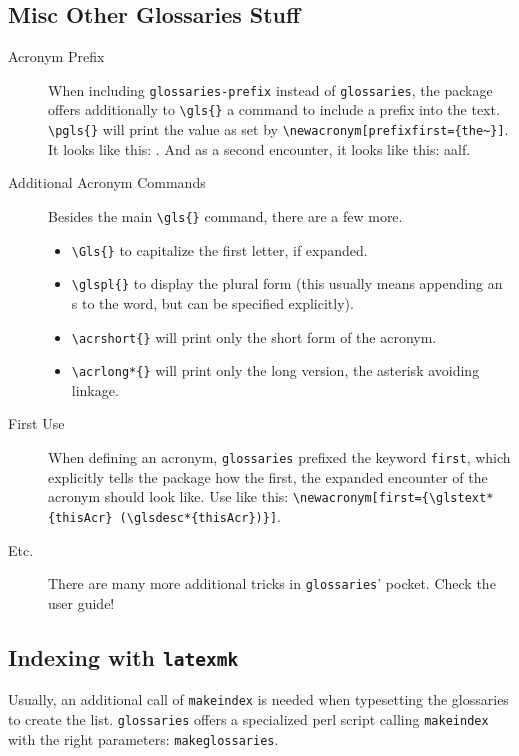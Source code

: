 \subsection{Misc Other Glossaries Stuff} %
\label{sub:misc_other_glossaries_stuff}
\begin{description}
	\item[Acronym Prefix] When including \texttt{glossaries-prefix} instead of \texttt{glossaries}, the package offers additionally to \verb|\gls{}| a command to include a prefix into the text. \verb|\pgls{}| will print the value as set by \verb|\newacronym[prefixfirst={the~}]|. It looks like this: . And as a second encounter, it looks like this: \gls{aalf}.
	\item[Additional Acronym Commands] Besides the main \verb|\gls{}| command, there are a few more. 
	\begin{itemize}
	 	\item \verb|\Gls{}| to capitalize the first letter, if expanded. 
	 	\item \verb|\glspl{}| to display the plural form (this usually means appending an s to the word, but can be specified explicitly).
	 	\item \verb|\acrshort{}| will print only the short form of the acronym.
	 	\item \verb|\acrlong*{}| will print only the long version, the asterisk avoiding linkage.
	 \end{itemize}
	 \item[First Use] When defining an acronym, \texttt{glossaries} prefixed the keyword \texttt{first}, which explicitly tells the package how the first, the expanded encounter of the acronym should look like. Use like this: \verb|\newacronym[first={\glstext*{thisAcr} (\glsdesc*{thisAcr})}]|.
	 \item[Etc.] There are many more additional tricks in \texttt{glossaries}' pocket. Check the user guide!
\end{description}
\subsection{Indexing with \texttt{latexmk}} %
\label{sub:indexing_with_latexmk}
Usually, an additional call of \texttt{makeindex} is needed when typesetting the glossaries to create the list. \texttt{glossaries}	offers a specialized perl script calling \texttt{makeindex} with the right parameters: \texttt{makeglossaries}.

